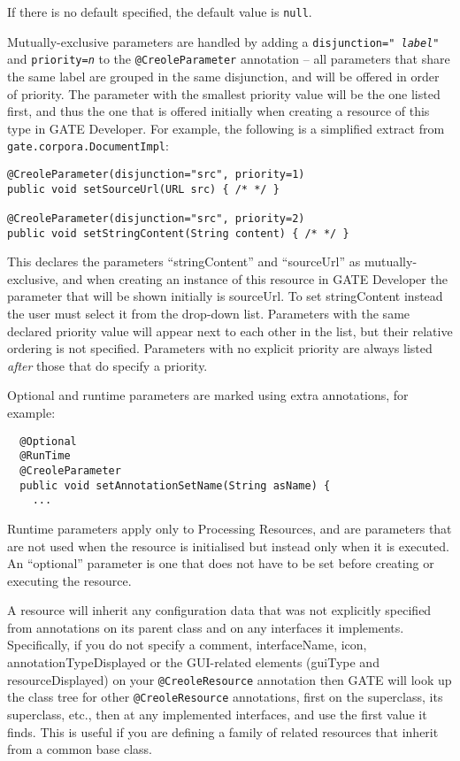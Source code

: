 If there is no default specified, the default value is {\tt null}.

Mutually-exclusive parameters are handled by adding a {\tt disjunction="{\it
label}"} and {\tt priority={\it n}} to the \verb|@CreoleParameter| annotation
-- all parameters that share the same label are grouped in the same
disjunction, and will be offered in order of priority.  The parameter with the
smallest priority value will be the one listed first, and thus the one that is
offered initially when creating a resource of this type in GATE Developer.  For
example, the following is a simplified extract from
{\tt gate.corpora.DocumentImpl}:

\begin{lstlisting}
@CreoleParameter(disjunction="src", priority=1)
public void setSourceUrl(URL src) { /* */ }

@CreoleParameter(disjunction="src", priority=2)
public void setStringContent(String content) { /* */ }
\end{lstlisting}

This declares the parameters ``stringContent'' and ``sourceUrl'' as
mutually-exclusive, and when creating an instance of this resource in GATE
Developer the parameter that will be shown initially is sourceUrl.  To set
stringContent instead the user must select it from the drop-down list.
Parameters with the same declared priority value will appear next to each other
in the list, but their relative ordering is not specified.  Parameters with no
explicit priority are always listed {\it after} those that do specify a
priority.

Optional and runtime parameters are marked using extra annotations, for example:
\begin{lstlisting}
  @Optional
  @RunTime
  @CreoleParameter
  public void setAnnotationSetName(String asName) {
    ...
\end{lstlisting}

Runtime parameters apply only to Processing Resources, and are parameters that
are not used when the resource is initialised but instead only when it is
executed.  An ``optional'' parameter is one that does not have to be set
before creating or executing the resource.


A resource
will inherit any configuration data that was not explicitly specified
from annotations on its parent class and on any interfaces it
implements.  Specifically, if you do not specify a comment,
interfaceName, icon, annotationTypeDisplayed or the GUI-related
elements (guiType and resourceDisplayed) on
your \verb|@CreoleResource| annotation then GATE will look up the
class tree for other \verb|@CreoleResource| annotations, first on the
superclass, its superclass, etc., then at any implemented interfaces,
and use the first value it finds.  This is useful if you are defining
a family of related resources that inherit from a common base class.

